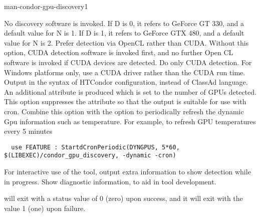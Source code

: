 \begin{ManPage}{}{man-condor-gpu-discovery}{1}
\begin{Options}
{    No discovery software is invoked.
    If D is 0, it refers to GeForce GT 330, and a default value for N is 1.
    If D is 1, it refers to GeForce GTX 480, and a default value for N is 2.
  }
   {
    Prefer detection via OpenCL rather than CUDA.
    Without this option, CUDA detection software is invoked first,
    and no further Open CL software is invoked if CUDA devices are detected.
  }
   {
    Do only CUDA detection.
  }
   {
    For Windows platforms only, use a CUDA driver rather than the
    CUDA run time.
  }
   {
    Output in the syntax of
    HTCondor configuration, instead of ClassAd language.
    An additional attribute is produced  which
    is set to the number of GPUs detected.
  }
   {
    This option suppresses the  attribute so that the output
    is suitable for use with  cron.
    Combine this option with the  option to periodically refresh the dynamic
    Gpu information such as temperature. For example, to refresh GPU temperatures every 5 minutes
  }
  \begin{verbatim}
  use FEATURE : StartdCronPeriodic(DYNGPUS, 5*60, $(LIBEXEC)/condor_gpu_discovery, -dynamic -cron)
  \end{verbatim}
   {
    For interactive use of the tool, output extra information to show 
    detection while in progress.
  }
   {
    Show diagnostic information, to aid in tool development.
  }
\end{Options}

\ExitStatus

 will exit with a status value of 0 (zero) upon success,
and it will exit with the value 1 (one) upon failure.


\end{ManPage}
